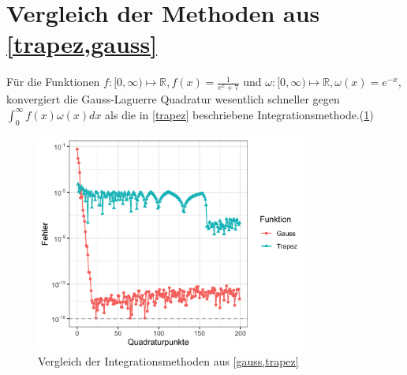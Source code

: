 \documentclass[12pt,a4paper]{scrartcl}
\numberwithin{equation}{section}
\numberwithin{myalgctr}{section}
\numberwithin{mytheoremctr}{subsection}
\numberwithin{mykorollarctr}{subsection}
\numberwithin{mylemmactr}{subsection}
\numberwithin{mybeispielctr}{subsection}
\begin{document}
	\section{Vergleich der Methoden aus \cref{trapez,gauss}}
	F\"ur die Funktionen $f:[0,\infty)\mapsto \mathbb{R},f(x)=\frac{1}{e^x+7}$ und $\omega:[0,\infty)\mapsto \mathbb{R},\omega(x)=e^{-x}$, konvergiert die Gauss-Laguerre Quadratur wesentlich schneller gegen $\int_{0}^{\infty}f(x)\omega(x)dx$ als die in \cref{trapez} beschriebene Integrationsmethode.(\cref{fig:vergleich})
	\begin{figure}[H]
		\begin{center}
			\includegraphics[width=0.8\textwidth]{../plots/aufgabe-e2.png}
		\end{center}
		\caption{Vergleich der Integrationsmethoden aus \cref{gauss,trapez}}
		\label{fig:vergleich}	
	\end{figure}
	
\end{document}
